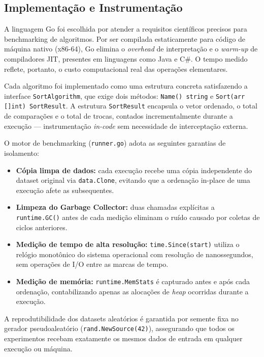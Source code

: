 \documentclass[12pt]{article}
\begin{document}
\subsection{Implementação e Instrumentação}
\label{subsec:impl}

A linguagem Go foi escolhida por atender a requisitos científicos
precisos para benchmarking de algoritmos. Por ser compilada
estaticamente para código de máquina nativo (x86-64), Go elimina
o \textit{overhead} de interpretação e o \textit{warm-up} de
compiladores JIT, presentes em linguagens como Java e C\#. O
tempo medido reflete, portanto, o custo computacional real das
operações elementares.

Cada algoritmo foi implementado como uma estrutura concreta
satisfazendo a interface \texttt{SortAlgorithm}, que exige dois
métodos: \texttt{Name() string} e
\texttt{Sort(arr []int) SortResult}. A estrutura \texttt{SortResult}
encapsula o vetor ordenado, o total de comparações e o total de
trocas, contados incrementalmente durante a execução — instrumentação
\textit{in-code} sem necessidade de interceptação externa.

O motor de benchmarking (\texttt{runner.go}) adota as seguintes
garantias de isolamento:

\begin{itemize}
  \item \textbf{Cópia limpa de dados:} cada execução recebe uma
        cópia independente do dataset original via \texttt{data.Clone},
        evitando que a ordenação in-place de uma execução afete
        as subsequentes.

  \item \textbf{Limpeza do Garbage Collector:} duas chamadas
        explícitas a \texttt{runtime.GC()} antes de cada medição
        eliminam o ruído causado por coletas de ciclos anteriores.

  \item \textbf{Medição de tempo de alta resolução:} \texttt{time.Since(start)}
        utiliza o relógio monotônico do sistema operacional com
        resolução de nanossegundos, sem operações de I/O entre
        as marcas de tempo.

  \item \textbf{Medição de memória:} \texttt{runtime.MemStats} é
        capturado antes e após cada ordenação, contabilizando
        apenas as alocações de \textit{heap} ocorridas durante
        a execução.
\end{itemize}

A reprodutibilidade dos datasets aleatórios é garantida por
semente fixa no gerador pseudoaleatório (\texttt{rand.NewSource(42)}),
assegurando que todos os experimentos recebam exatamente os
mesmos dados de entrada em qualquer execução ou máquina.
\end{document}

